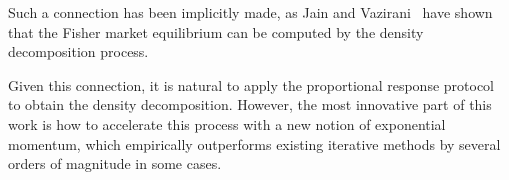 Such a connection has been implicitly made, as Jain and Vazirani~\cite{DBLP:journals/geb/JainV10} have shown that the Fisher market equilibrium can be computed by the density decomposition process.

Given this connection, it is natural to apply the proportional response protocol~\cite{DBLP:conf/icalp/Zhang09,birnbaum2011distributed} to obtain the density decomposition. However, the most innovative part of this work is how to accelerate this process with a new notion of exponential momentum, which empirically outperforms existing iterative methods by several orders of magnitude in some cases.







